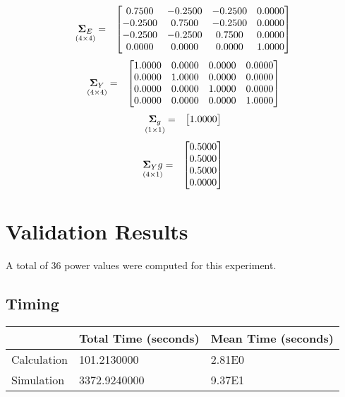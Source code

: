 \documentclass{glimmpse-report}
\begin{document}
\begin{eqnarray*}
\underset{\left(4\times4\right)}{\mathbf{\Sigma}_E} & = & \begin{bmatrix}0.7500 & -0.2500 & -0.2500 & 0.0000\protect\\
-0.2500 & 0.7500 & -0.2500 & 0.0000\protect\\
-0.2500 & -0.2500 & 0.7500 & 0.0000\protect\\
0.0000 & 0.0000 & 0.0000 & 1.0000\protect\\
\end{bmatrix}
\end{eqnarray*}
\begin{eqnarray*}
\underset{\left(4\times4\right)}{\mathbf{\Sigma}_Y} & = & \begin{bmatrix}1.0000 & 0.0000 & 0.0000 & 0.0000\protect\\
0.0000 & 1.0000 & 0.0000 & 0.0000\protect\\
0.0000 & 0.0000 & 1.0000 & 0.0000\protect\\
0.0000 & 0.0000 & 0.0000 & 1.0000\protect\\
\end{bmatrix}
\end{eqnarray*}
\begin{eqnarray*}
\underset{\left(1\times1\right)}{\mathbf{\Sigma}_g} & = & \begin{bmatrix}1.0000\protect\\
\end{bmatrix}
\end{eqnarray*}
\begin{eqnarray*}
\underset{\left(4\times1\right)}{\mathbf{\Sigma}_Yg} & = & \begin{bmatrix}0.5000\protect\\
0.5000\protect\\
0.5000\protect\\
0.0000\protect\\
\end{bmatrix}
\end{eqnarray*}
\section{Validation Results}
A total of 36 power values were computed for this experiment.

\subsection{Timing}
\begin{tabular}{|l|l|l|}
\hline
 & Total Time (seconds) & Mean Time (seconds) \\ 
\hline
Calculation & 101.2130000 & 2.81E0\tabularnewline
\hline
Simulation & 3372.9240000 & 9.37E1\tabularnewline
\hline
\end{tabular}
\end{document}
